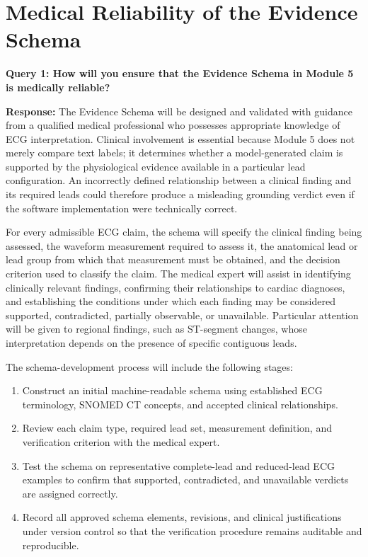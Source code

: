 \documentclass{ssnreview}
\begin{document}
\section{Medical Reliability of the Evidence Schema}

\textbf{Query 1: How will you ensure that the Evidence Schema in Module 5 is medically
reliable?}

\textbf{Response:} The Evidence Schema will be designed and validated with guidance from
a qualified medical professional who possesses appropriate knowledge of ECG
interpretation. Clinical involvement is essential because Module 5 does not merely compare
text labels; it determines whether a model-generated claim is supported by the
physiological evidence available in a particular lead configuration. An incorrectly defined
relationship between a clinical finding and its required leads could therefore produce a
misleading grounding verdict even if the software implementation were technically correct.

For every admissible ECG claim, the schema will specify the clinical finding being assessed,
the waveform measurement required to assess it, the anatomical lead or lead group from
which that measurement must be obtained, and the decision criterion used to classify the
claim. The medical expert will assist in identifying clinically relevant findings, confirming
their relationships to cardiac diagnoses, and establishing the conditions under which each
finding may be considered supported, contradicted, partially observable, or unavailable.
Particular attention will be given to regional findings, such as ST-segment changes, whose
interpretation depends on the presence of specific contiguous leads.

The schema-development process will include the following stages:

\begin{enumerate}[label=\arabic*.,leftmargin=*,align=left]
  \item Construct an initial machine-readable schema using established ECG terminology,
  SNOMED CT concepts, and accepted clinical relationships.

  \item Review each claim type, required lead set, measurement definition, and verification
  criterion with the medical expert.

  \item Test the schema on representative complete-lead and reduced-lead ECG examples to
  confirm that supported, contradicted, and unavailable verdicts are assigned correctly.

  \item Record all approved schema elements, revisions, and clinical justifications under
  version control so that the verification procedure remains auditable and reproducible.
\end{enumerate}
\end{document}
